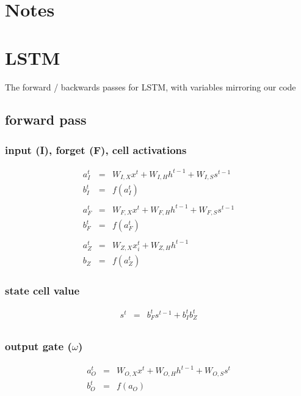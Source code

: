 \documentclass{article}
\begin{document}
\section{Notes}

\section{LSTM}
The forward / backwards passes for LSTM, with variables mirroring our code

\subsection{forward pass}

\subsubsection{input (I), forget (F), cell activations}

\begin{eqnarray*}
a_{I}^t &=& W_{I,X}x^t + W_{I,H}h^{t-1}+W_{I,S}s^{t-1} \\
b_{I}^t &=& f(a_{I}^t) \\
\\
a_{F}^t &=& W_{F, X}x^t + W_{F, H}h^{t-1}+W_{F, S}s^{t-1} \\
b_{F}^t &=& f(a_{F}^t) \\
\\
a_{Z}^t &=& W_{Z,X}x_i^t + W_{Z,H} h^{t-1} \\
b_{Z} &=& f(a_{Z}^t) 
\end{eqnarray*}

\subsubsection{state cell value}
\begin{eqnarray*}
s^t &=& b_{F}^ts^{t-1} + b_{I}^t b_Z^t \\  
\end{eqnarray*}

\subsubsection{output gate ($\omega$)}
\begin{eqnarray*}
a_{O}^t &=& W_{O,X}x^t + W_{O,H}h^{t-1} + W_{O,S}s^t \\
b_{O}^t &=& f(a_{O}) \\
\end{eqnarray*}
\end{document}
